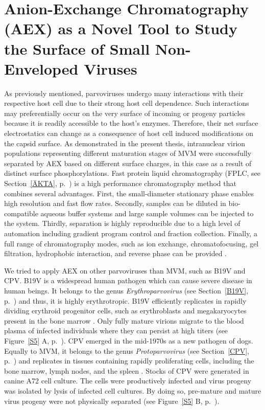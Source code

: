 \section[AEX as a Novel Tool to Study the Surface of Small Non-Enveloped Viruses]{Anion-Exchange Chromatography (AEX) as a Novel Tool to Study the Surface of Small Non-Enveloped Viruses}


As previously mentioned, parvoviruses undergo many interactions with their respective host cell due to their strong host cell dependence. Such interactions may preferentially occur on the very surface of incoming or progeny particles because it is readily accessible to the host's enzymes. Therefore, their net surface electrostatics can change as a consequence of host cell induced modifications on the capsid surface. As demonstrated in the present thesis, intranuclear virion populations representing different maturation stages of MVM were successfully separated by AEX based on different surface charges, in this case as a result of distinct surface phosphorylations. Fast protein liquid chromatography (FPLC, see Section~\ref{ÄKTA}, p.~\pageref{ÄKTA}) is a high performance chromatography method that combines several advantages. First, the small-diameter stationary phase enables high resolution and fast flow rates. Secondly, samples can be diluted in bio-compatible aqueous buffer systems and large sample volumes can be injected to the system. Thirdly, separation is highly reproducible due to a high level of automation including gradient program control and fraction collection. Finally, a full range of chromatography modes, such as ion exchange, chromatofocusing, gel filtration, hydrophobic interaction, and reverse phase can be provided \cite{pmid20978981}. 

We tried to apply AEX on other parvoviruses than MVM, such as B19V and CPV. B19V is a widespread human pathogen which can cause severe disease in human beings. It belongs to the genus \textit{Erythroparvovirus} (see Section~\ref{B19V}, p.~\pageref{B19V}) and thus, it is highly erythrotropic. B19V efficiently replicates in rapidly dividing erythroid progenitor cells, such as erythroblasts and megakaryocytes present in the bone marrow \cite{pmid12097253}. Only fully mature virions migrate to the blood plasma of infected individuals where they can persist at high titers (see Figure~\ref{S5} A, p.~\pageref{S5}). CPV emerged in the mid-1970s as a new pathogen of dogs. Equally to MVM, it belongs to the genus \textit{Protoparvovirus} (see Section~\ref{CPV}, p.~\pageref{CPV}) and replicates in tissues containing rapidly proliferating cells, including the bone marrow, lymph nodes, and the spleen \cite{pmid20152105}. Stocks of CPV were generated in canine A72 cell culture. The cells were productively infected and virus progeny was isolated by lysis of infected cell cultures. By doing so, pre-mature and mature virus progeny were not physically separated (see Figure~\ref{S5} B, p.~\pageref{S5}). 

